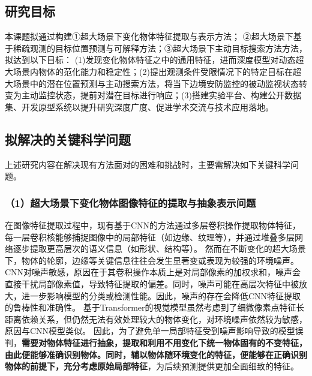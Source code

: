 \subsection{研究目标}

本课题拟通过构建①超大场景下变化物体特征提取与表示方法；
②超大场景下基于稀疏观测的目标位置预测与可解释方法；③超大场景下主动目标搜索方法方法，拟达到以下目标：
(1)发现变化物体特征之中的通用特征，进而深度模型对动态超大场景内物体的范化能力和稳定性；(2)提出观测条件受限情况下的特定目标在超大场景中的潜在位置预测与主动搜索方法，将当下边境安防监控的被动监视状态转变为主动监控状态，提前对潜在目标进行响应；(3)搭建实验平台、构建公开数据集、开发原型系统以提升研究深度广度、促进学术交流与技术应用落地。

\subsection{拟解决的关键科学问题}

上述研究内容在解决现有方法面对的困难和挑战时，主要需解决如下关键科学问题。


\subsubsection*{\bfseries （1）超大场景下变化物体图像特征的提取与抽象表示问题}
在图像特征提取过程中，现有基于CNN的方法通过多层卷积操作提取物体特征，每一层卷积核能够捕捉图像中的局部特征（如边缘、纹理等），并通过堆叠多层网络逐步提取更高层次的语义信息（如形状、结构等）。
然而在不断变化的超大场景下，物体的轮廓，边缘等关键信息往往会发生显著变或表现为较强的环境噪声。
CNN对噪声敏感，原因在于其卷积操作本质上是对局部像素的加权求和，噪声会直接干扰局部像素值，导致特征提取的偏差。同时，噪声可能在高层次特征中被放大，进一步影响模型的分类或检测性能。因此，噪声的存在会降低CNN特征提取的鲁棒性和准确性。
基于Transformer的视觉模型虽然考虑到了细微像素点特征长距离依赖关系，但仍然无法有效处理较大的物体变化，对环境噪声依然较为敏感，原因与CNN模型类似。
因此，为了避免单一局部特征受到噪声影响导致的模型误判，\textbf{需要对物体特征进行抽象，提取和利用不用变化下统一物体固有的不变特征，由此便能够准确识别物体。同时，辅以物体随环境变化的特征，便能够在正确识别物体的前提下，充分考虑原始局部特征}，为后续预测提供更加全面细致的特征。


